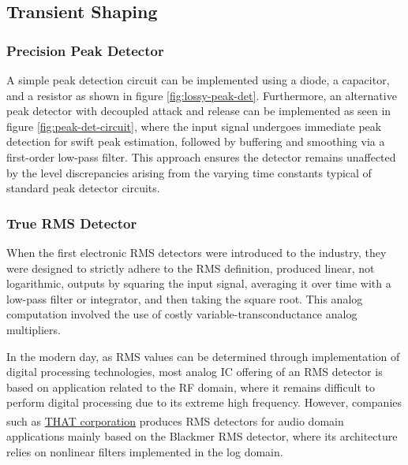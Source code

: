 \documentclass[10pt]{article}
\begin{document}
\begin{multicols*}{2}
\begin{minipage}{\linewidth}
                            \label{plot:tanh}
                        
                        \end{minipage}
            
            \subsection{Transient Shaping}

                \subsubsection{Precision Peak Detector}
                    A simple peak detection circuit can be implemented using a diode, a capacitor, and a resistor as shown in figure \ref{fig:lossy-peak-det}. Furthermore, an alternative peak detector with decoupled attack and release can be implemented as seen in figure \ref{fig:peak-det-circuit}, where the input signal undergoes immediate peak detection for swift peak estimation, followed by buffering and smoothing via a first-order low-pass filter. This approach ensures the detector remains unaffected by the level discrepancies arising from the varying time constants typical of standard peak detector circuits.

                \subsubsection{True RMS Detector}
                    When the first electronic RMS detectors were introduced to the industry, they were designed to strictly adhere to the RMS definition, produced linear, not logarithmic, outputs by squaring the input signal, averaging it over time with a low-pass filter or integrator, and then taking the square root. This analog computation involved the use of costly variable-transconductance analog multipliers. \cite{rms-history}\par
                    In the modern day, as RMS values can be determined through implementation of digital processing technologies, most analog IC offering of an RMS detector is based on application related to the RF domain, where it remains difficult to perform digital processing due to its extreme high frequency. However, companies such as \href{https://www.thatcorp.com/}{THAT corporation\textsuperscript{\texttrademark}} produces RMS detectors for audio domain applications mainly based on the Blackmer RMS detector, where its architecture relies on nonlinear filters implemented in the log domain.


\end{multicols*}
\end{document}

